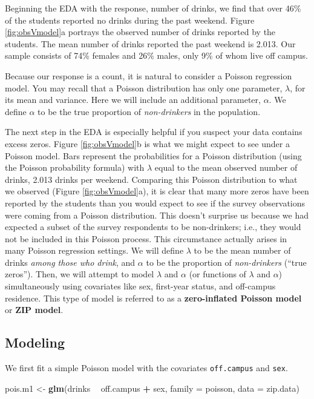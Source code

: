 \documentclass[
]{krantz}
\newenvironment{Shaded}{\begin{snugshade}}{\end{snugshade}}
\newcommand{\DataTypeTok}[1]{\textcolor[rgb]{0.27,0.27,0.27}{#1}}
\newcommand{\KeywordTok}[1]{\textcolor[rgb]{0.27,0.27,0.27}{\textbf{#1}}}
\newcommand{\NormalTok}[1]{#1}
\newcommand{\OperatorTok}[1]{\textcolor[rgb]{0.43,0.43,0.43}{\textbf{#1}}}
\newcommand{\StringTok}[1]{\textcolor[rgb]{0.5,0.5,0.5}{#1}}
\begin{document}
Beginning the EDA with the response, number of drinks, we find that over 46\% of the students reported no drinks during the past weekend. Figure \ref{fig:obsVmodel}a portrays the observed number of drinks reported by the students. The mean number of drinks reported the past weekend is 2.013. Our sample consists of 74\% females and 26\% males, only 9\% of whom live off campus.

Because our response is a count, it is natural to consider a Poisson regression model. You may recall that a Poisson distribution has only one parameter, \(\lambda\), for its mean and variance. Here we will include an additional parameter, \(\alpha\). We define \(\alpha\) to be the true proportion of \emph{non-drinkers} in the population.

The next step in the EDA is especially helpful if you suspect your data contains excess zeros. Figure \ref{fig:obsVmodel}b is what we might expect to see under a Poisson model. Bars represent the probabilities for a Poisson distribution (using the Poisson probability formula) with \(\lambda\) equal to the mean observed number of drinks, 2.013 drinks per weekend. Comparing this Poisson distribution to what we observed (Figure \ref{fig:obsVmodel}a), it is clear that many more zeros have been reported by the students than you would expect to see if the survey observations were coming from a Poisson distribution. This doesn't surprise us because we had expected a subset of the survey respondents to be non-drinkers; i.e., they would not be included in this Poisson process. This circumstance actually arises in many Poisson regression settings. We will define \(\lambda\) to be the mean number of drinks \emph{among those who drink}, and \(\alpha\) to be the proportion of \emph{non-drinkers} (``true zeros''). Then, we will attempt to model \(\lambda\) and \(\alpha\) (or functions of \(\lambda\) and \(\alpha\)) simultaneously using covariates like sex, first-year status, and off-campus residence. This type of model is referred to as a \textbf{zero-inflated Poisson model} or \textbf{ZIP model}. 

\hypertarget{modeling}{%
\subsection{Modeling}\label{modeling}}

We first fit a simple Poisson model with the covariates \texttt{off.campus} and \texttt{sex}.

\begin{Shaded}
\begin{Highlighting}[]
\NormalTok{pois.m1 <-}\StringTok{ }\KeywordTok{glm}\NormalTok{(drinks }\OperatorTok{~}\StringTok{ }\NormalTok{off.campus }\OperatorTok{+}\StringTok{ }\NormalTok{sex, }\DataTypeTok{family =}\NormalTok{ poisson,}
               \DataTypeTok{data =}\NormalTok{ zip.data)}
\end{Highlighting}
\end{Shaded}
\end{document}
